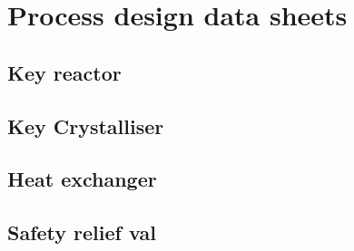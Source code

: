 \section{Process design data sheets}

\subsection{Key reactor}

\subsection{Key Crystalliser}

\subsection{Heat exchanger}

\subsection{Safety relief val}

\subsection{}

\subsection{}

\subsection{}

\subsection{}

\subsection{}

\subsection{}

\subsection{}
